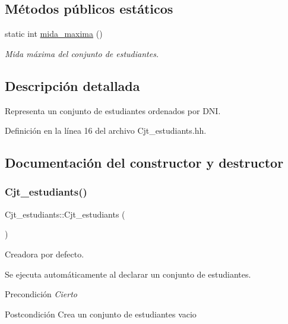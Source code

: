 \subsection*{Métodos públicos estáticos}
\begin{DoxyCompactItemize}
\item 
static int \hyperlink{class_cjt__estudiants_a171fdff58b408ccbf647ab594b5eafa4}{mida\+\_\+maxima} ()
\begin{DoxyCompactList}\small\item\em Mida máxima del conjunto de estudiantes. \end{DoxyCompactList}\end{DoxyCompactItemize}


\subsection{Descripción detallada}
Representa un conjunto de estudiantes ordenados por D\+NI. 

Definición en la línea 16 del archivo Cjt\+\_\+estudiants.\+hh.



\subsection{Documentación del constructor y destructor}
\mbox{\label{class_cjt__estudiants_a31ffe72cadcf58d82c8b9f6659c56e7a}} 
\subsubsection{\texorpdfstring{Cjt\+\_\+estudiants()}{Cjt\_estudiants()}}
{\footnotesize\ttfamily Cjt\+\_\+estudiants\+::\+Cjt\+\_\+estudiants (\begin{DoxyParamCaption}{ }\end{DoxyParamCaption})}



Creadora por defecto. 

Se ejecuta automáticamente al declarar un conjunto de estudiantes. \begin{DoxyPrecond}{Precondición}
{\itshape Cierto} 
\end{DoxyPrecond}
\begin{DoxyPostcond}{Postcondición}
Crea un conjunto de estudiantes vacio 
\end{DoxyPostcond}


